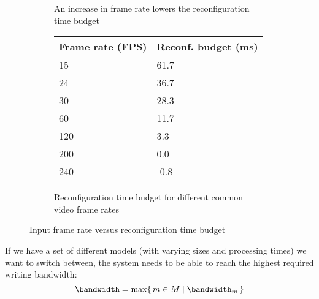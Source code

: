 \begin{figure}[htbp]
    \centering
    \begin{subfigure}[b]{0.48\textwidth}
        \begin{adjustbox}{width=\linewidth}
        
        \end{adjustbox}
        \caption{An increase in frame rate lowers the reconfiguration time budget}
        \label{}
    \end{subfigure}
    \hfill
    \begin{subfigure}[b]{0.48\textwidth}
        \begin{tabular}{@{}ll@{}}
        \toprule
        Frame rate (FPS) & Reconf. budget (ms) \\ \midrule
        15               & 61.7                \\
        24               & 36.7                \\
        30               & 28.3                \\
        60               & 11.7                \\
        120              & 3.3                 \\
        200              & 0.0                 \\
        240              & -0.8                \\ \bottomrule
        \end{tabular}
        \caption{Reconfiguration time budget for different common video frame rates}
        \label{tab:common_fps}
    \end{subfigure}
    \caption[]{Input frame rate versus reconfiguration time budget}
    \label{fig:frame_rate_versus_time_budget}
\end{figure}

If we have a set of different models (with varying sizes and processing times) we want to switch between, the system needs to be able to reach the highest required writing bandwidth:
\begin{equation}
    \bandwidth = \max\{\,m \in M \mid \bandwidth_m \,\} 
\end{equation}

